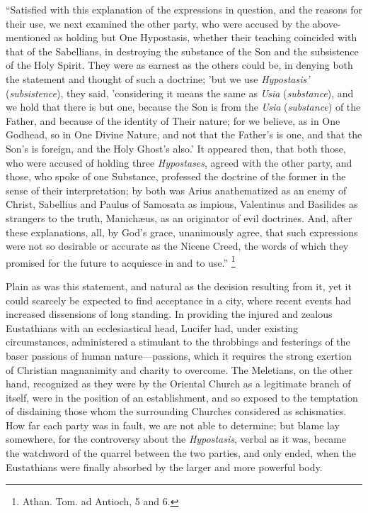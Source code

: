 ``Satisfied with this explanation of the expressions in
question, and the reasons for their use, we next examined the other
party, who were accused by the above-mentioned as holding but One
Hypostasis, whether their teaching coincided with that of the
Sabellians, in destroying the substance of the Son and the subsistence
of the Holy Spirit. They were as earnest as the others could be, in
denying both the statement and thought of such a doctrine; 'but we use
\emph{Hypostasis'} (\emph{subsistence}), they said, 'considering it
means the same as \emph{Usia} (\emph{substance}), and we hold that
there is but one, because the Son is from the \emph{Usia} (\emph{substance})
of the Father, and because of the identity of Their nature; for we
believe, as in One Godhead, so in One Divine Nature, and not that the
Father's is one, and that the Son's is foreign, and the Holy Ghost's
also.' It appeared then, that both those, who were accused of
holding three \emph{Hypostases}, agreed with the other party, and
those, who spoke of one Substance, professed the doctrine of the
former in the sense of their interpretation; by both was Arius
anathematized as an enemy of Christ, Sabellius and Paulus of Samosata
as impious, Valentinus and Basilides as strangers to the truth,
Manichæus, as an originator of evil doctrines. And, after these
explanations, all, by God's grace, unanimously agree, that such
expressions were not so desirable or accurate as the Nicene Creed, the
words of which they promised for the future to acquiesce in and to
use.'' \footnote{Athan. Tom. ad Antioch, 5 and 6.}

Plain as was this statement, and natural as the decision resulting
from it, yet it could scarcely be expected to find acceptance in a
city, where recent events had increased dissensions of long standing.
In providing the injured and zealous Eustathians with an
ecclesiastical head, Lucifer had, under existing circumstances,
administered a stimulant to the throbbings and festerings of the baser
passions of human nature—passions, which it requires the strong
exertion of Christian magnanimity and charity to overcome. The
Meletians, on the other hand, recognized as they were by the Oriental
Church as a legitimate branch of itself, were in the position of an
establishment, and so exposed to the temptation of disdaining those
whom the surrounding Churches considered as schismatics. How far each
party was in fault, we are not able to determine; but blame lay
somewhere, for the controversy about the \emph{Hypostasis}, verbal as
it was, became the watchword of the quarrel between the two parties,
and only ended, when the Eustathians were finally absorbed by the
larger and more powerful body.

